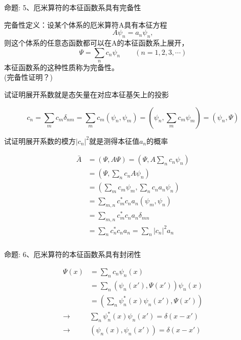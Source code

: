 \begin{frame} [allowframebreaks=]
    \frametitle{}
    \begin{tcolorbox1}{命题:}
        5、厄米算符的本征函数系具有完备性
     \end{tcolorbox1}
    \alert{完备性定义：}设某个体系的厄米算符A具有本征方程
    \begin{equation*}
        A\psi_{n}=a_n\psi_{n}, 
    \end{equation*}  
    则这个体系的任意态函数都可以在A的本征函数系上展开，
    \begin{equation*}
        \Psi=\sum_n c_n \psi_{n} \qquad (n=1,2,3,\cdots)
    \end{equation*}
    本征函数系的这种性质称为完备性。\\
    (完备性证明？)
    \begin{exampleblock}{}
        试证明展开系数就是态矢量在对应本征基矢上的投影
    \end{exampleblock}
    \begin{equation*}
        c_n=\sum_m c_m\delta_{nm} = \sum_m c_m(\psi_n, \psi_m)= (\psi_n, \sum_m c_m\psi_m) =(\psi_n, \Psi)
    \end{equation*}
    \begin{exampleblock}{}
        试证明展开系数的模方$|c_n|^2$就是测得本征值$a_n$的概率
    \end{exampleblock}
    \begin{equation*}
        \begin{split}
            \bar{A}&=(\Psi, A\Psi)=(\Psi, A\sum_n c_n \psi_{n})\\
            &=(\Psi, \sum_n c_n A\psi_{n})\\
            &=(\sum_m c_m \psi_{m}, \sum_n c_n a_n \psi_{n})\\
            &=\sum_{m,n} c_m^* c_n a_n (\psi_m, \psi_n)\\
            &=\sum_{m,n} c_m^* c_n a_n \delta_{mn}\\
            &=\sum_{n} c_n^* c_n a_n =\sum_{n} |c_n|^2 a_n 
        \end{split}
    \end{equation*}
\end{frame} 

\begin{frame} [allowframebreaks=]
    \frametitle{}
    \begin{tcolorbox1}{命题:}
        6、厄米算符的本征函数系具有封闭性
     \end{tcolorbox1}
    \begin{equation*}
        \begin{split}
            \Psi(x)&=\sum_n c_n \psi_{n}(x) \\
            &=\sum_n (\psi_n(x'), \Psi(x')) \psi_{n}(x)\\
            &= (\sum_n\psi_{n} ^* (x)\psi_n(x'), \Psi(x')) \\
            \to &\sum_n\psi_{n} ^* (x)\psi_n(x')=\delta(x-x')\\
            \to &(\psi_{n}(x),\psi_n(x'))=\delta(x-x')
        \end{split} 
    \end{equation*}
\end{frame} 

